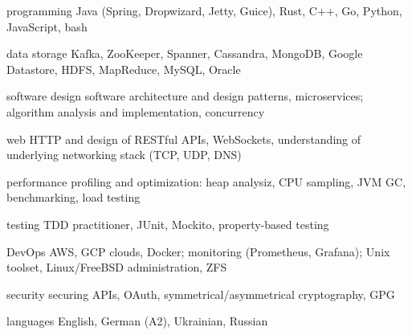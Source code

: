 

\begin{cvskills}

  \cvskill
    {programming} %
    {Java (Spring, Dropwizard, Jetty, Guice), Rust, C++, Go, Python, JavaScript, bash} %

  \cvskill
    {data storage} %
    {Kafka, ZooKeeper, Spanner, Cassandra, MongoDB, Google Datastore, HDFS, MapReduce, MySQL, Oracle} %

  \cvskill
    {software design} %
    {software architecture and design patterns, microservices; algorithm analysis and implementation, concurrency} %

  \cvskill
    {web} %
    {HTTP and design of RESTful APIs, WebSockets, understanding of underlying networking stack (TCP, UDP, DNS)} %

  \cvskill
    {performance} %
    {profiling and optimization: heap analysiz, CPU sampling, JVM GC, benchmarking, load testing} %

  \cvskill
    {testing} %
    {TDD practitioner, JUnit, Mockito, property-based testing} %

  \cvskill
    {DevOps} %
		{AWS, GCP clouds, Docker; monitoring (Prometheus, Grafana); Unix toolset, Linux/FreeBSD administration, ZFS} %

  \cvskill
    {security} %
    {securing APIs, OAuth, symmetrical/asymmetrical cryptography, GPG} %

  \cvskill
    {languages} %
    {English, German (A2), Ukrainian, Russian} %

\end{cvskills}
